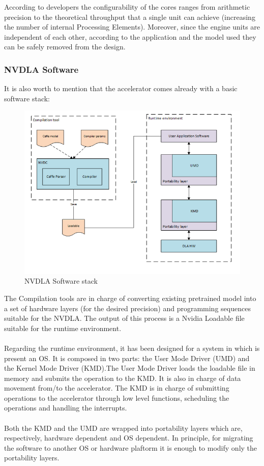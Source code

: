 According to developers the configurability of the cores ranges from arithmetic precision to the theoretical throughput that a single unit can achieve (increasing the number of internal Processing Elements). Moreover, since the engine units are independent of each other, according to the application and the model used they can be safely removed from the design.
\newpage
\subsubsection{ NVDLA Software }
It is also worth to mention that the accelerator comes already with a basic software stack:
\begin{figure}[H]
\centering
\captionsetup{justification=centering}
\includegraphics[scale=0.8]{./figure/nvdla_software.PNG}
\caption{NVDLA Software stack\cite{WEBSITE:7}}
\label{fig:nvdlasw}
\end{figure}

The Compilation tools are in charge of converting existing pretrained model into a set of hardware layers (for the desired precision) and programming sequences suitable for the NVDLA. The output of this process is a Nvidia Loadable file suitable for the runtime environment.\\\\
Regarding the runtime environment, it has been designed for a system in which is present an OS. It is composed in two parts: the User Mode Driver (UMD) and the Kernel Mode Driver (KMD).\newline The User Mode Driver loads the loadable file in memory and submits the operation to the KMD. It is also in charge of data movement from/to the accelerator. \newline The KMD is in charge of submitting operations to the accelerator through low level functions, scheduling the operations and handling the interrupts.\\\\
Both the KMD and the UMD are wrapped into portability layers which are, respectively, hardware dependent and OS dependent. In principle, for migrating the software to another OS or hardware plaftorm it is enough to modify only the portability layers.
\newpage
